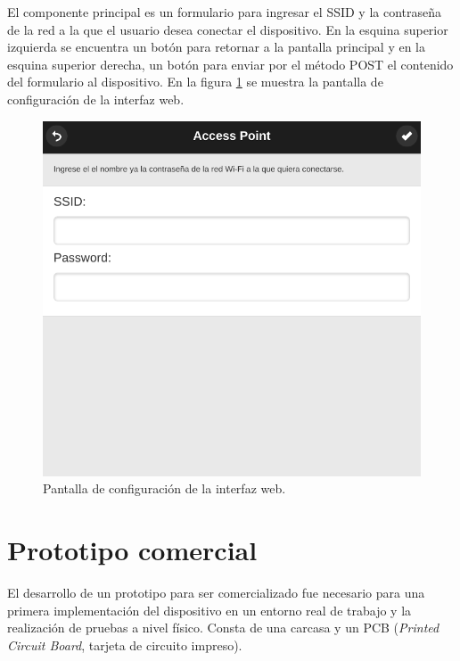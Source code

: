 El componente principal es un formulario para ingresar el SSID y la contraseña de la red a la que el usuario desea conectar el dispositivo. En la esquina superior izquierda se encuentra un botón para retornar a la pantalla principal y en la esquina superior derecha, un botón para enviar por el método POST el contenido del formulario al dispositivo. En la figura \ref{fig:interfaceConf} se muestra la pantalla de configuración de la interfaz web.

\begin{figure}[h]
	\centering
	\includegraphics[scale=0.33]{./Figures/interface_conf.png}
	\caption{Pantalla de configuración de la interfaz web.}
	\label{fig:interfaceConf}
\end{figure}

\section{Prototipo comercial}

El desarrollo de un prototipo para ser comercializado fue necesario para una primera implementación del dispositivo en un entorno real de trabajo y la realización de pruebas a nivel físico. Consta de una carcasa y un PCB (\textit{Printed Circuit Board}, tarjeta de circuito impreso).


